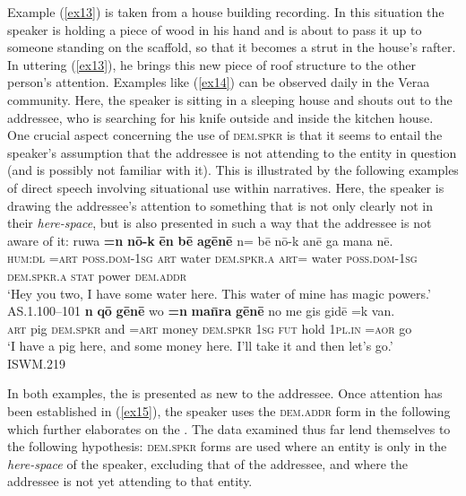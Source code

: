 \documentclass[output=paper
,modfonts
,nonflat]{langsci/langscibook}
\begin{document}
\noindent
Example (\ref{ex13}) is taken from a house building recording. In this situation the speaker is holding a piece of wood in his hand and is about to pass it up to someone standing on the scaffold, so that it becomes a strut in the house's rafter. In uttering (\ref{ex13}), he brings this new piece of roof structure to the other person's attention. Examples like (\ref{ex14}) can be observed daily in the Vera{\textquotesingle}a community. Here, the speaker is sitting in a sleeping house and shouts out to the addressee, who is searching for his knife outside and inside the kitchen house. One crucial aspect concerning the use of \textsc{dem.spkr} is that it seems to entail the speaker's assumption that the addressee is not attending to the entity in question (and is possibly not familiar with it). This is illustrated by the following examples of direct speech involving situational use within narratives. Here, the speaker is drawing the addressee's attention to something that is not only clearly not in their \textit{here-space}, but is also presented in such a way that the addressee is not aware of it:
\ea \label{ex15}
\gll 	ruwa		\textbf{=n}	\textbf{n\=o-k}			\textbf{\=en}		\textbf{b\=e}		\textbf{ag\=en\=e}	n=	b\=e 	n\=o-k 				an\=e		ga		mana	n\=e.	\\
\textsc{hum:dl}	\textsc{=art}		\textsc{poss.dom-1sg}	\textsc{art}	water	\textsc{dem.spkr.a}	\textsc{art=}	water	\textsc{poss.dom-1sg}		\textsc{\textsc{dem.spkr.a}}	\textsc{stat}	power	\textsc{dem.addr} \\
\glt	`Hey you two, I have some water here. This water of mine has magic powers.'		\hfill{AS.1.100--101}
\z
\ea \label{ex16}
\gll \textbf{n} 		\textbf{q\=o} 	\textbf{g\=en\=e} wo	\textbf{=n}	\textbf{ma\=nra}	\textbf{g\=en\=e} 	no		me	gis	gid\=e		=k		van.	\\
\textsc{art}	pig	\textsc{dem.spkr}	and	\textsc{=art}		money	\textsc{dem.spkr}	\textsc{1sg}	\textsc{fut}	hold	\textsc{1pl.in}	\textsc{=aor}		go	\\
\glt	`I have a pig here, and some money here. I'll take it and then let's go.'\\													\hfill{ISWM.219}
\z

\noindent
In both examples, the  is presented as new to the addressee. Once attention has been established in (\ref{ex15}), the speaker uses the \textsc{dem.addr} form in the following  which further elaborates on the . The data examined thus far lend themselves to the following hypothesis: \textsc{dem.spkr} forms are used where an entity is only in the \textit{here-space} of the speaker, excluding that of the addressee, and where the addressee is not yet attending to that entity.
\end{document}
